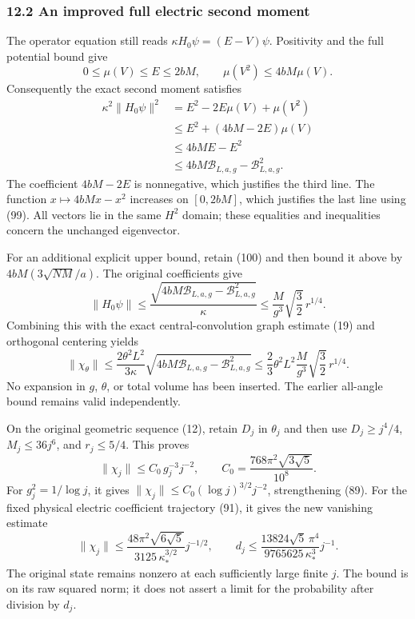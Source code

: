 \documentclass[
  11pt,
]{article}
\begin{document}
\subsubsection{12.2 An improved full electric second
moment}\label{an-improved-full-electric-second-moment}

The operator equation still reads \(\kappa H_0\psi=(E-V)\psi\).
Positivity and the full potential bound give \[
 0\le\mu(V)\le E\le2bM,\qquad
 \mu(V^2)\le4bM\mu(V).
\] Consequently the exact second moment satisfies \[
 \begin{split}
 \kappa^2\|H_0\psi\|^2
 &=E^2-2E\mu(V)+\mu(V^2)\\
 &\le E^2+(4bM-2E)\mu(V)\\
 &\le4bME-E^2\\
 &\le4bM\mathcal B_{L,a,g}-\mathcal B_{L,a,g}^2 .
 \end{split}
 \tag{100}
\] The coefficient \(4bM-2E\) is nonnegative, which justifies the third
line. The function \(x\mapsto4bMx-x^2\) increases on \([0,2bM]\), which
justifies the last line using (99). All vectors lie in the same \(H^2\)
domain; these equalities and inequalities concern the unchanged
eigenvector.

For an additional explicit upper bound, retain (100) and then bound it
above by \(4bM(3\sqrt{NM}/a)\). The original coefficients give \[
 \|H_0\psi\|
 \le\frac{\sqrt{4bM\mathcal B_{L,a,g}-\mathcal B_{L,a,g}^2}}{\kappa}
 \le\frac{M}{g^3}\sqrt{\frac32}\,r^{1/4}.
 \tag{101}
\] Combining this with the exact central-convolution graph estimate (19)
and orthogonal centering yields \[
 \|\chi_\theta\|
 \le\frac{2\theta^2L^2}{3\kappa}
       \sqrt{4bM\mathcal B_{L,a,g}-\mathcal B_{L,a,g}^2}
 \le\frac23\theta^2L^2\frac{M}{g^3}
       \sqrt{\frac32}\,r^{1/4}.
 \tag{102}
\] No expansion in \(g\), \(\theta\), or total volume has been inserted.
The earlier all-angle bound remains valid independently.

On the original geometric sequence (12), retain \(D_j\) in \(\theta_j\)
and then use \(D_j\ge j^4/4\), \(M_j\le36j^6\), and \(r_j\le5/4\). This
proves \[
 \|\chi_j\|\le C_0\,g_j^{-3}j^{-2},\qquad
 C_0=\frac{768\pi^2\sqrt{3\sqrt5}}{10^8}.
 \tag{103}
\] For \(g_j^2=1/\log j\), it gives
\(\|\chi_j\|\le C_0(\log j)^{3/2}j^{-2}\), strengthening (89). For the
fixed physical electric coefficient trajectory (91), it gives the new
vanishing estimate \[
 \|\chi_j\|\le
 \frac{48\pi^2\sqrt{6\sqrt5}}{3125\,\kappa_*^{3/2}}j^{-1/2},
 \qquad
 d_j\le\frac{13824\sqrt5\,\pi^4}
 {9765625\,\kappa_*^3}j^{-1}.
 \tag{104}
\] The original state remains nonzero at each sufficiently large finite
\(j\). The bound is on its raw squared norm; it does not assert a limit
for the probability after division by \(d_j\).
\end{document}
